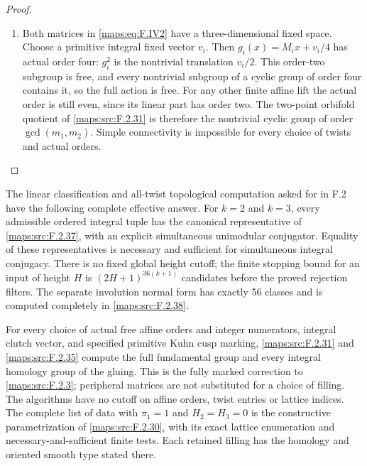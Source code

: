 \begin{proof}
\begin{enumerate}[label=\arabic*.]
\item Both matrices in \eqref{maps:eq:F.IV2} have a three-dimensional fixed
space.  Choose a primitive integral fixed vector $v_i$.
Then $g_i(x)=M_ix+v_i/4$ has actual order four:
$g_i^2$ is the nontrivial translation $v_i/2$.
This order-two subgroup is free, and every nontrivial
subgroup of a cyclic group of order four contains it, so
the full action is free.  For any other finite affine lift
the actual order is still even, since its linear part has
order two.  The two-point orbifold quotient of \ref{maps:src:F.2.31} is
therefore the nontrivial cyclic group of order
$\gcd(m_1,m_2)$.  Simple connectivity is impossible for
every choice of twists and actual orders.

\end{enumerate}
\end{proof}




\begin{theorem}\label{maps:src:F.2.39}


The linear classification and all-twist topological computation
asked for in F.2 have the following complete effective answer.
For $k=2$ and $k=3$, every admissible ordered integral tuple
has the canonical representative of \ref{maps:src:F.2.37}, with an explicit
simultaneous unimodular conjugator.  Equality of these
representatives is necessary and sufficient for simultaneous
integral conjugacy.  There is no fixed global height cutoff;
the finite stopping bound for an input of height $H$ is
$(2H+1)^{36(k+1)}$ candidates before the proved rejection
filters.  The separate involution normal form has exactly
56 classes and is computed completely in \ref{maps:src:F.2.38}.

For every choice of actual free affine orders and integer
numerators, integral clutch vector, and specified primitive
Kuhn cusp marking, \ref{maps:src:F.2.31} and \ref{maps:src:F.2.35} compute the full
fundamental group and every integral homology group of the
gluing.  This is the fully marked correction to \ref{maps:src:F.2.3};
peripheral matrices are not substituted for a choice of
filling.  The algorithms have no cutoff on affine orders,
twist entries or lattice indices.  The complete list of data
with $\pi_1=1$ and $H_2=H_3=0$ is the constructive
parametrization of \ref{maps:src:F.2.30}, with its exact lattice enumeration
and necessary-and-sufficient finite tests.  Each retained
filling has the homology and oriented smooth type stated
there.

\end{theorem}


